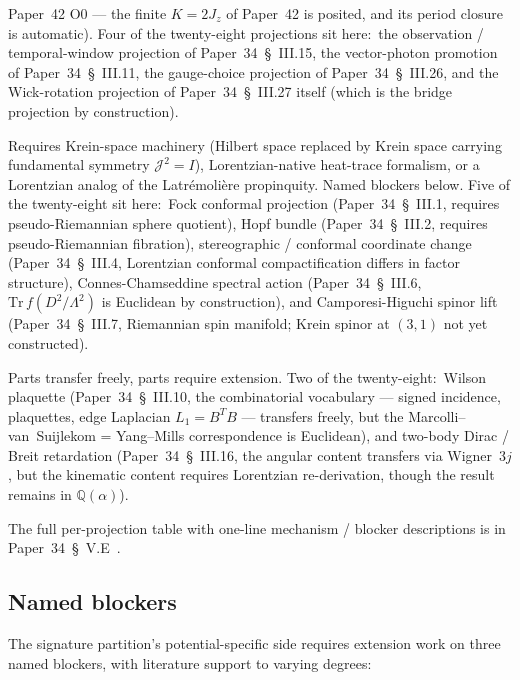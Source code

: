 \documentclass[twocolumn,pra,amsmath,amssymb,superscriptaddress]{revtex4-2}
\begin{document}
\begin{description}
  Paper~42 O0 --- the finite $K = 2J_z$ of Paper~42 is posited, and
  its period closure is automatic).
  Four of the twenty-eight projections sit here:\ the observation /
  temporal-window projection of Paper~34~\S~III.15, the vector-photon
  promotion of Paper~34~\S~III.11, the gauge-choice projection of
  Paper~34~\S~III.26, and the Wick-rotation projection of
  Paper~34~\S~III.27 itself (which is the bridge projection by
  construction).
\item[\textsc{euclidean specific}.]  Requires Krein-space machinery
  (Hilbert space replaced by Krein space carrying fundamental symmetry
  $\mathcal{J}^2 = I$), Lorentzian-native heat-trace formalism, or a
  Lorentzian analog of the Latr\'emoli\`ere propinquity.  Named
  blockers below.  Five of the twenty-eight sit here:\ Fock conformal
  projection (Paper~34~\S~III.1, requires pseudo-Riemannian sphere
  quotient), Hopf bundle (Paper~34~\S~III.2, requires pseudo-Riemannian
  fibration), stereographic / conformal coordinate change
  (Paper~34~\S~III.4, Lorentzian conformal compactification differs in
  factor structure), Connes-Chamseddine spectral action
  (Paper~34~\S~III.6, $\mathrm{Tr}\,f(D^2/\Lambda^2)$ is Euclidean by
  construction), and Camporesi-Higuchi spinor lift
  (Paper~34~\S~III.7, Riemannian spin manifold; Krein spinor at $(3,1)$
  not yet constructed).
\item[\textsc{mixed}.]  Parts transfer freely, parts require extension.
  Two of the twenty-eight:\ Wilson plaquette
  (Paper~34~\S~III.10, the combinatorial vocabulary --- signed
  incidence, plaquettes, edge Laplacian $L_1 = B^T B$ --- transfers
  freely, but the Marcolli--van~Suijlekom = Yang--Mills correspondence
  is Euclidean), and two-body Dirac / Breit retardation
  (Paper~34~\S~III.16, the angular content transfers via Wigner~$3j$,
  but the kinematic content requires Lorentzian re-derivation, though
  the result remains in $\mathbb{Q}(\alpha)$).
\end{description}

The full per-projection table with one-line mechanism / blocker
descriptions is in Paper~34~\S~V.E~\cite{paper34}.

\subsection{Named blockers}
\label{sec:sig_blockers}

The signature partition's potential-specific side requires extension
work on three named blockers, with literature support to varying
degrees:
\end{document}
